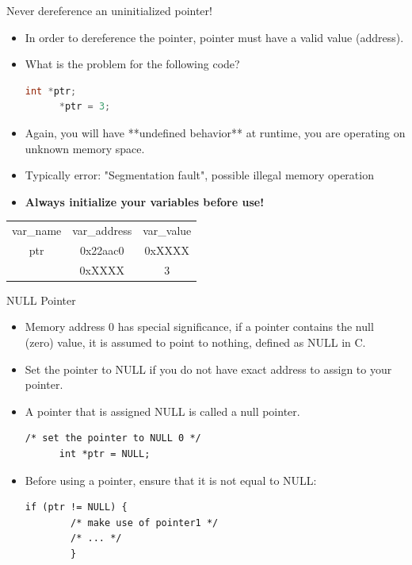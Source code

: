 \documentclass[10pt,t]{beamer}
\begin{document}
\begin{frame}[fragile]{Never dereference an uninitialized pointer!}
  \begin{itemize}
  \item In order to dereference the pointer, pointer must have a valid value (address).
  \item What is the problem for the following code?
    \begin{lstlisting}[language=C,basicstyle=\scriptsize\ttfamily]
      int *ptr;
      *ptr = 3; 
    \end{lstlisting}
  \item Again, you will have **undefined behavior** at runtime, you are operating on unknown memory space.
  \item Typically error: "Segmentation fault", possible illegal memory operation
  \item \textbf{Always initialize your variables before use!}
  \end{itemize}
  \begin{center}
    \begin{tabular}{c|c|c|}
      \cline{2-3}
      var\_name & var\_address & var\_value \\
      \cline{2-3}
      ptr & 0x22aac0 & 0xXXXX \\
      \cline{2-3}
      & 0xXXXX   & 3 \\
      \cline{2-3}
    \end{tabular}
  \end{center}
\end{frame}

\begin{frame}[fragile]{NULL Pointer}
  \begin{itemize}
  \item Memory address 0 has special significance, if a pointer contains the
    null (zero) value, it is assumed to point to nothing, defined as NULL
    in C.
  \item Set the pointer to NULL if you do not have exact address to assign
    to your pointer.
  \item A pointer that is assigned NULL is called a null pointer.
    \begin{lstlisting}[basicstyle=\scriptsize\ttfamily]
      /* set the pointer to NULL 0 */
      int *ptr = NULL;
    \end{lstlisting}
  \item Before using a pointer, ensure that it is not equal to NULL:
    \begin{lstlisting}[basicstyle=\scriptsize\ttfamily]
      if (ptr != NULL) {
        /* make use of pointer1 */
        /* ... */
        }
    \end{lstlisting}
  \end{itemize}
\end{frame}
\end{document}
